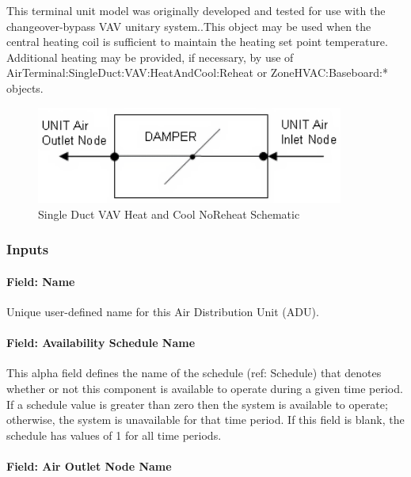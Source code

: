 This terminal unit model was originally developed and tested for use with the changeover-bypass VAV unitary system..This object may be used when the central heating coil is sufficient to maintain the heating set point temperature. Additional heating may be provided, if necessary, by use of AirTerminal:SingleDuct:VAV:HeatAndCool:Reheat or ZoneHVAC:Baseboard:* objects.

\begin{figure}[hbtp] %
\centering
\includegraphics[width=0.9\textwidth, height=0.9\textheight, keepaspectratio=true]{media/image268.png}
\caption{Single Duct VAV Heat and Cool NoReheat Schematic \protect \label{fig:single-duct-vav-heat-and-cool-noreheat}}
\end{figure}

\subsubsection{Inputs}\label{inputs-6-000}

\paragraph{Field: Name}\label{field-name-6-000}

Unique user-defined name for this Air Distribution Unit (ADU).

\paragraph{Field: Availability Schedule Name}\label{field-availability-schedule-name-6}

This alpha field defines the name of the schedule (ref: Schedule) that denotes whether or not this component is available to operate during a given time period. If a schedule value is greater than zero then the system is available to operate; otherwise, the system is unavailable for that time period. If this field is blank, the schedule has values of 1 for all time periods.

\paragraph{Field: Air Outlet Node Name}\label{field-air-outlet-node-name-5}

